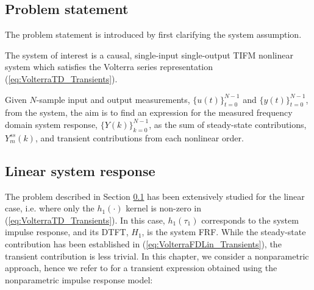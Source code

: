 \subsection{Problem statement}
\label{sec:ProblemState_Transients}

The problem statement is introduced by first clarifying the system assumption.

\begin{assum}
The system of interest is a causal, single-input single-output TIFM nonlinear system which satisfies the Volterra series representation (\ref{eq:VolterraTD_Transients}). 
\end{assum}

Given $N$-sample input and output measurements, $\{u(t)\}_{t=0}^{N-1}$ and $\{y(t)\}_{t=0}^{N-1}$, from the system, the aim is to find an expression for the measured frequency domain system response, $\{Y(k)\}_{k=0}^{N-1}$, as the sum of steady-state contributions, $Y_m^{ss}(k)$, and transient contributions from each nonlinear order.

\subsection{Linear system response}

The problem described in Section \ref{sec:ProblemState_Transients} has been extensively studied for the linear case, i.e. where only the $h_1(\cdot)$ kernel is non-zero in (\ref{eq:VolterraTD_Transients}). In this case, $h_1(\tau_1)$ corresponds to the system impulse response, and its DTFT, $H_1$, is the system FRF. While the steady-state contribution has been established in (\ref{eq:VolterraFDLin_Transients}), the transient contribution is less trivial. In this chapter, we consider a nonparametric approach, hence we refer to \cite{Lataire2016} for a transient expression obtained using the nonparametric impulse response model:

